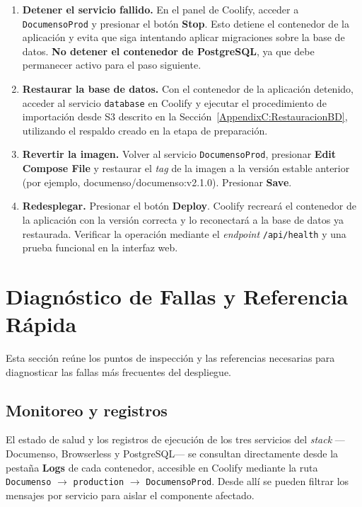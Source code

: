 \begin{enumerate}
    \item \textbf{Detener el servicio fallido.} En el panel de Coolify, acceder a \texttt{DocumensoProd} y presionar el botón \textbf{Stop}. Esto detiene el contenedor de la aplicación y evita que siga intentando aplicar migraciones sobre la base de datos. \textbf{No detener el contenedor de PostgreSQL}, ya que debe permanecer activo para el paso siguiente.

    \item \textbf{Restaurar la base de datos.} Con el contenedor de la aplicación detenido, acceder al servicio \texttt{database} en Coolify y ejecutar el procedimiento de importación desde S3 descrito en la Sección~\ref{AppendixC:RestauracionBD}, utilizando el respaldo creado en la etapa de preparación.

    \item \textbf{Revertir la imagen.} Volver al servicio \texttt{DocumensoProd}, presionar \textbf{Edit Compose File} y restaurar el \textit{tag} de la imagen a la versión estable anterior (por ejemplo, documenso/documenso:v2.1.0). Presionar \textbf{Save}.

    \item \textbf{Redesplegar.} Presionar el botón \textbf{Deploy}. Coolify recreará el contenedor de la aplicación con la versión correcta y lo reconectará a la base de datos ya restaurada. Verificar la operación mediante el \textit{endpoint} \texttt{/api/health} y una prueba funcional en la interfaz web.
\end{enumerate}


\section{Diagnóstico de Fallas y Referencia Rápida}
\label{AppendixC:Diagnostico}

Esta sección reúne los puntos de inspección y las referencias necesarias para diagnosticar las fallas más frecuentes del despliegue.

\subsection{Monitoreo y registros}

El estado de salud y los registros de ejecución de los tres servicios del \textit{stack} ---Documenso, Browserless y PostgreSQL--- se consultan directamente desde la pestaña \textbf{Logs} de cada contenedor, accesible en Coolify mediante la ruta \texttt{Documenso} $\rightarrow$ \texttt{production} $\rightarrow$ \texttt{DocumensoProd}. Desde allí se pueden filtrar los mensajes por servicio para aislar el componente afectado.

